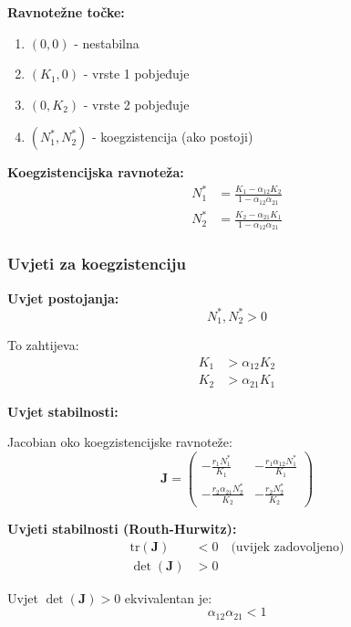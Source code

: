 \documentclass[11pt,oneside]{book}
\begin{document}
\textbf{Ravnotežne točke:}

\begin{enumerate}
	\item $(0, 0)$ - nestabilna
	\item $(K_1, 0)$ - vrste 1 pobjeđuje
	\item $(0, K_2)$ - vrste 2 pobjeđuje  
	\item $(N_1^*, N_2^*)$ - koegzistencija (ako postoji)
\end{enumerate}

\textbf{Koegzistencijska ravnoteža:}
\begin{align}
	N_1^* &= \frac{K_1 - \alpha_{12}K_2}{1 - \alpha_{12}\alpha_{21}} \\
	N_2^* &= \frac{K_2 - \alpha_{21}K_1}{1 - \alpha_{12}\alpha_{21}}
\end{align}

\subsubsection{Uvjeti za koegzistenciju}

\textbf{Uvjet postojanja:}
\begin{equation}
	N_1^*, N_2^* > 0
\end{equation}

To zahtijeva:
\begin{align}
	K_1 &> \alpha_{12}K_2 \\
	K_2 &> \alpha_{21}K_1
\end{align}

\textbf{Uvjet stabilnosti:}

Jacobian oko koegzistencijske ravnoteže:
\begin{equation}
	\mathbf{J} = \begin{pmatrix}
		-\frac{r_1 N_1^*}{K_1} & -\frac{r_1 \alpha_{12} N_1^*}{K_1} \\
		-\frac{r_2 \alpha_{21} N_2^*}{K_2} & -\frac{r_2 N_2^*}{K_2}
	\end{pmatrix}
\end{equation}

\textbf{Uvjeti stabilnosti (Routh-Hurwitz):}
\begin{align}
	\text{tr}(\mathbf{J}) &< 0 \quad \text{(uvijek zadovoljeno)} \\
	\det(\mathbf{J}) &> 0
\end{align}

Uvjet $\det(\mathbf{J}) > 0$ ekvivalentan je:
\begin{equation}
	\alpha_{12}\alpha_{21} < 1
\end{equation}
\end{document}
